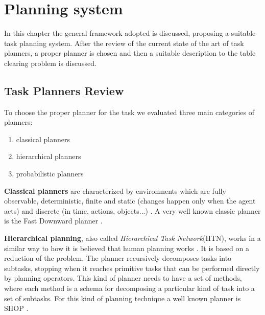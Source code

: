 \chapter{Planning system}
\label{ch:planning_system}
In this chapter the general framework adopted is discussed, proposing a suitable task planning system. After the  review of the current state of the art of task planners, a proper planner is chosen and then a suitable description to the table clearing problem is discussed.
\section{Task Planners Review}
To choose the proper planner for the task we evaluated three main categories of planners:
\begin{enumerate}
\item classical planners
\item hierarchical planners
\item probabilistic planners
\end{enumerate}
\textbf{Classical planners} are characterized by environments which are fully observable, deterministic, finite and static (changes happen only when the agent acts) and discrete (in time, actions, objects...) \citep{artificialIntelligence}.  A very well known classic planner is the Fast Downward planner \cite{helmert2006fast}.


\textbf{Hierarchical planning}, also called \textit{Hierarchical Task Network}(HTN), works in a similar way to how it is believed that human planning 
works \citep{marthi2007angelic}. It is based on a reduction of the problem. The planner recursively decomposes tasks into subtasks, stopping when it reaches primitive tasks that can be performed directly by planning operators. This kind of planner needs to have a set of methods, where each method is a schema for decomposing a particular kind of task into a set of subtasks. For this kind of planning technique a well known planner is SHOP \citep{shop}.

